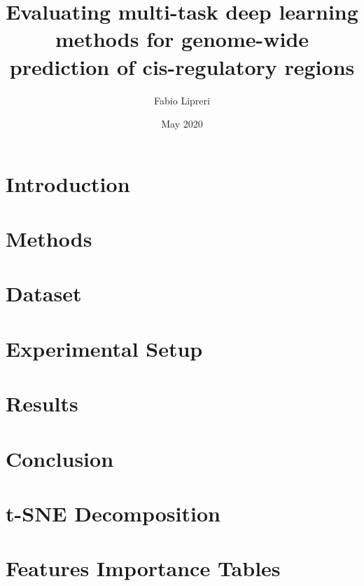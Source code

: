 \documentclass[12pt]{report}
\title{Evaluating multi-task deep learning methods for genome-wide prediction of cis-regulatory regions}
\author{Fabio Lipreri}
\date{May 2020}
\begin{document}
\maketitle

\tableofcontents{}

\chapter{Introduction}


\chapter{Methods} \label{cap:methods}


\chapter{Dataset}


\chapter{Experimental Setup}


\chapter{Results}


\chapter{Conclusion}


\appendix
\chapter{t-SNE Decomposition} \label{appendix:tsne}


\chapter{Features Importance Tables} \label{appendix:features_tables}








\printbibliography
\end{document}
